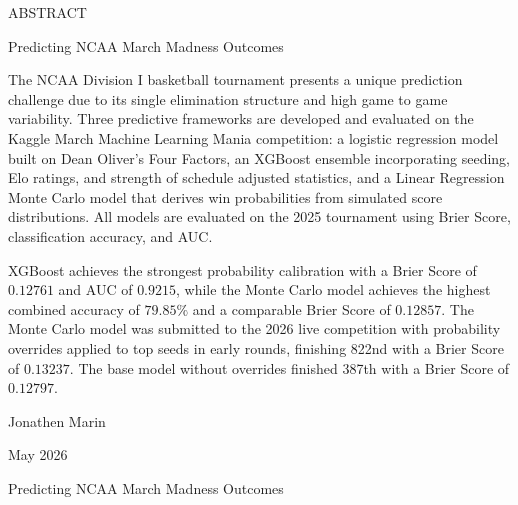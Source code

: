 \documentclass[12pt,leqno]{article}\usepackage[pdftex]{graphicx}\usepackage[dvipsnames]{xcolor}
\theoremstyle{remark}
\begin{document}
\begin{center}
ABSTRACT
\end{center}

\begin{center}
Predicting NCAA March Madness Outcomes
\end{center}

\doublespacing
The NCAA Division I basketball tournament presents a unique prediction challenge due to its single elimination structure and high game to game variability. Three predictive frameworks are developed and evaluated on the Kaggle March Machine Learning Mania competition: a logistic regression model built on Dean Oliver's Four Factors, an XGBoost ensemble incorporating seeding, Elo ratings, and strength of schedule adjusted statistics, and a Linear Regression Monte Carlo model that derives win probabilities from simulated score distributions. All models are evaluated on the 2025 tournament using Brier Score, classification accuracy, and AUC.

XGBoost achieves the strongest probability calibration with a Brier Score of $0.12761$ and AUC of $0.9215$, while the Monte Carlo model achieves the highest combined accuracy of $79.85\%$ and a comparable Brier Score of $0.12857$. The Monte Carlo model was submitted to the 2026 live competition with probability overrides applied to top seeds in early rounds, finishing 822nd with a Brier Score of $0.13237$. The base model without overrides finished 387th with a Brier Score of $0.12797$.

\singlespacing
\vskip 0.3in
\noindent Jonathen Marin%

\noindent May 2026 %
\thispagestyle{empty}
\newpage

\mbox{}
\thispagestyle{empty}
\newpage

\begin{center}
Predicting NCAA March Madness Outcomes
\end{center}
\end{document}
